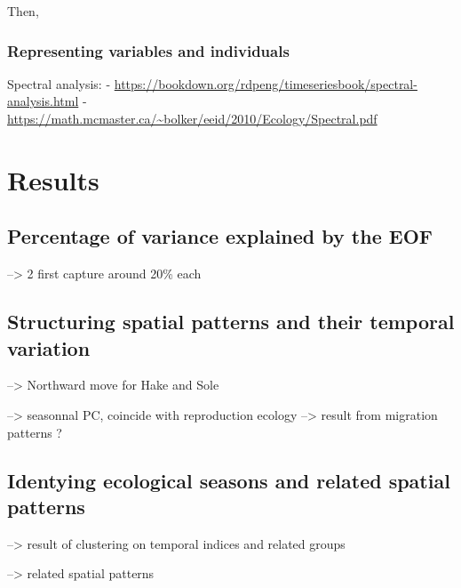 \documentclass[
  english,
  man]{apa6}
\begin{document}
Then,

\hypertarget{representing-variables-and-individuals}{%
\subsubsection{Representing variables and individuals}\label{representing-variables-and-individuals}}

Spectral analysis:
- \url{https://bookdown.org/rdpeng/timeseriesbook/spectral-analysis.html}
- \url{https://math.mcmaster.ca/~bolker/eeid/2010/Ecology/Spectral.pdf}

\hypertarget{results}{%
\section{Results}\label{results}}

\hypertarget{percentage-of-variance-explained-by-the-eof}{%
\subsection{Percentage of variance explained by the EOF}\label{percentage-of-variance-explained-by-the-eof}}

--\textgreater{} 2 first capture around 20\% each

\hypertarget{structuring-spatial-patterns-and-their-temporal-variation}{%
\subsection{Structuring spatial patterns and their temporal variation}\label{structuring-spatial-patterns-and-their-temporal-variation}}

--\textgreater{} Northward move for Hake and Sole

--\textgreater{} seasonnal PC, coincide with reproduction ecology
--\textgreater{} result from migration patterns ?

\hypertarget{identying-ecological-seasons-and-related-spatial-patterns}{%
\subsection{Identying ecological seasons and related spatial patterns}\label{identying-ecological-seasons-and-related-spatial-patterns}}

--\textgreater{} result of clustering on temporal indices and related groups

--\textgreater{} related spatial patterns
\end{document}
